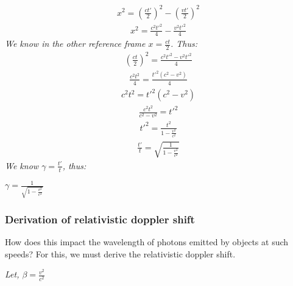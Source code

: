 \documentclass{article}
\begin{document}
\begin{gather*}
	x^2 =  \left(\frac{ct'}{2}\right)^2 - \left(\frac{vt'}{2}\right)^2
\end{gather*}
\begin{gather*}
x^2 = \frac{c^2{t'}^2}{4} - \frac{v^2{t'}^2}{4}
\end{gather*}
\textit{We know in the other reference frame $x = \frac{ct}{2}$. Thus:}
\begin{gather*}
	\left(\frac{ct}{2}\right)^2 = \frac{c^2{t'}^2 - v^2{t'}^2}{4} 
\end{gather*}
\begin{gather*}
	\frac{c^2t^2}{4} = \frac{{t'}^2(c^2 - v^2)}{4} 
\end{gather*}
\begin{gather*}
	c^2t^2 = {t'}^2(c^2-v^2)
\end{gather*}
\begin{gather*}
	\frac{c^2t^2}{c^2 - v^2} = {t'}^2
\end{gather*}
\begin{gather*}
	{t'}^2 = \frac{t^2}{1 - \frac{v^2}{c^2}}
\end{gather*}
\begin{gather*}
\frac{{t'}}{t} = \sqrt{\frac{1}{1 - \frac{v^2}{c^2}}}
\end{gather*}
\textit{We know $\gamma = \frac{t'}{t}$, thus:}
\begin{center}
	$\boxed{ \gamma = {\frac{1}{\sqrt{1 - \frac{v^2}{c^2}}}}}
	$
\end{center}

\subsubsection{Derivation of relativistic doppler shift}


How does this impact the wavelength of photons emitted by objects at such speeds? For this, we must derive the relativistic doppler shift. 

\textit{Let, $\beta = \frac{v^2}{c^2}$}
\end{document}
